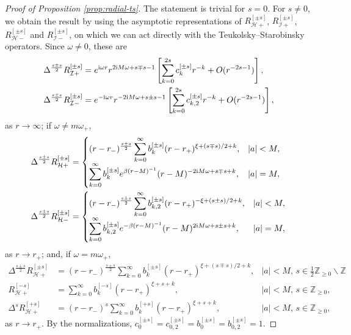 \documentclass[11pt]{article}
\newcommand{\ii}{\mathrm{i}}
\newcommand{\cH}{\mathcal H}
\newcommand{\cI}{\mathcal I}
\numberwithin{equation}{section}
\begin{document}
\begin{proof}[Proof of Proposition \ref{prop:radial-ts}]
The statement is trivial for $s=0$. For $s\neq0$, we obtain the result by using the asymptotic representations of $R^{[\pm s]}_{\cH+}$, $R^{[\pm s]}_{\cI+}$, $R^{[\pm s]}_{\cH-}$ and $R^{[\pm s]}_{\cI-}$, on which we can act directly with the Teukolsky--Starobinsky operators. Since $\omega\neq 0$, these are
\begin{align}
\Delta^{\frac{s\pm s}{2}}R^{[\pm s]}_{\cI+}
&=e^{\ii\omega r}r^{2\ii M\omega+s\mp s-1}
\left[\sum_{k=0}^{2s}c^{[\pm s]}_kr^{-k}+O(r^{-2s-1})\right],
\notag\\
\Delta^{\frac{s\pm s}{2}}R^{[\pm s]}_{\cI-}
&=e^{-\ii\omega r}r^{-2\ii M\omega+s\pm s-1}
\left[\sum_{k=0}^{2s}c^{[\pm s]}_{k,2}r^{-k}+O(r^{-2s-1})\right],
\label{eq:asymptotic-representations-infty}
\end{align}
as $r\to \infty$; if $\omega\neq m\omega_+$,
\begin{align}
\Delta^{\frac{s\pm s}{2}}R^{[\pm s]}_{\cH+}
&=
\begin{cases}
\displaystyle (r-r_-)^{\frac{s\pm s}{2}}\sum_{k=0}^{\infty}b^{[\pm s]}_k(r-r_+)^{\xi+(s\mp s)/2+k}, & |a|<M,\\[2mm]
\displaystyle \sum_{k=0}^{\infty}b^{[\pm s]}_ke^{\beta(r-M)^{-1}}(r-M)^{-2\ii M\omega+s\mp s+k}, & |a|=M,
\end{cases}
\notag\\
\Delta^{\frac{s\pm s}{2}}R^{[\pm s]}_{\cH-}
&=
\begin{cases}
\displaystyle (r-r_-)^{\frac{s\pm s}{2}}\sum_{k=0}^{\infty}b^{[\pm s]}_{k,2}(r-r_+)^{-\xi+(s\pm s)/2+k}, & |a|<M,\\[2mm]
\displaystyle \sum_{k=0}^{\infty}b^{[\pm s]}_{k,2}e^{-\beta(r-M)^{-1}}(r-M)^{2\ii M\omega+s\pm s+k}, & |a|=M,
\end{cases}
\label{eq:asymptotic-representations-hor1}
\end{align}
as $r\to r_+$; 
and, if $\omega=m\omega_+$,
\begin{align}
\Delta^{\frac{s\pm s}{2}}R^{[\pm s]}_{\cH+}
&= (r-r_-)^{\frac{s\pm s}{2}}\sum_{k=0}^{\infty}b^{[\pm s]}_k(r-r_+)^{\xi+ (s\mp s)/2+k}, & |a|<M, \, s\in\frac12\mathbb Z_{\geq 0}\backslash \mathbb Z \\
R^{[- s]}_{\cH+}
&= \sum_{k=0}^{\infty}b^{[- s]}_k(r-r_+)^{\xi+ s+k}, & |a|<M,\, s\in \mathbb Z_{\geq 0},\\
\Delta^s R^{[+s]}_{\cH+}
&=
\displaystyle (r-r_-)^s\sum_{k=0}^{\infty}b^{[+s]}_k(r-r_+)^{\xi+s+k}, & |a|<M, \, s\in \mathbb Z_{\geq 0},
\label{eq:asymptotic-representations-hor2}
\end{align}
as $r\to r_+$.
 By the normalizations, $c^{[\pm s]}_0=c^{[\pm s]}_{0,2}=b^{[\pm s]}_0=b^{[\pm s]}_{0,2}=1$.


\end{proof}
\end{document}

